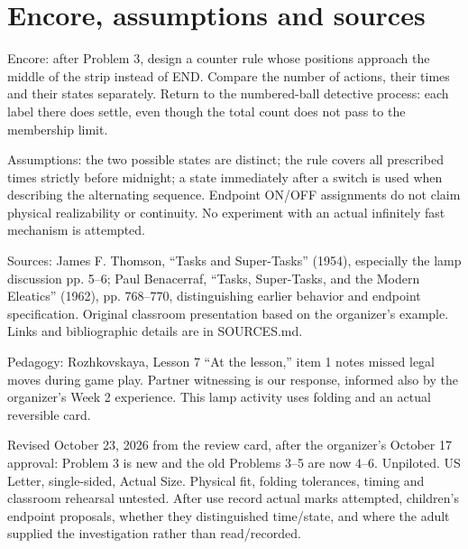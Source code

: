 \documentclass[11pt,letterpaper]{article}
\begin{document}
\section*{Encore, assumptions and sources}
Encore: after Problem 3, design a counter rule whose positions approach the middle of the strip instead of END. Compare the number of actions, their times and their states separately. Return to the numbered-ball detective process: each label there does settle, even though the total count does not pass to the membership limit.

Assumptions: the two possible states are distinct; the rule covers all prescribed times strictly before midnight; a state immediately after a switch is used when describing the alternating sequence. Endpoint ON/OFF assignments do not claim physical realizability or continuity. No experiment with an actual infinitely fast mechanism is attempted.

Sources: James F. Thomson, ``Tasks and Super-Tasks'' (1954), especially the lamp discussion pp. 5--6; Paul Benacerraf, ``Tasks, Super-Tasks, and the Modern Eleatics'' (1962), pp. 768--770, distinguishing earlier behavior and endpoint specification. Original classroom presentation based on the organizer's example. Links and bibliographic details are in SOURCES.md.

Pedagogy: Rozhkovskaya, Lesson 7 ``At the lesson,'' item 1 notes missed legal moves during game play. Partner witnessing is our response, informed also by the organizer's Week 2 experience. This lamp activity uses folding and an actual reversible card.

Revised October 23, 2026 from the review card, after the organizer's October 17 approval: Problem 3 is new and the old Problems 3--5 are now 4--6. Unpiloted. US Letter, single-sided, Actual Size. Physical fit, folding tolerances, timing and classroom rehearsal untested. After use record actual marks attempted, children's endpoint proposals, whether they distinguished time/state, and where the adult supplied the investigation rather than read/recorded.
\end{document}

